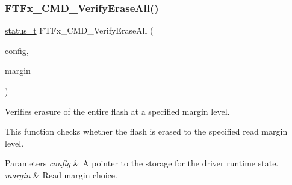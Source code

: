\subsubsection{\texorpdfstring{FTFx\_CMD\_VerifyEraseAll()}{FTFx\_CMD\_VerifyEraseAll()}}
{\footnotesize\ttfamily \mbox{\hyperlink{group__ksdk__common_gaaabdaf7ee58ca7269bd4bf24efcde092}{status\+\_\+t}} F\+T\+Fx\+\_\+\+C\+M\+D\+\_\+\+Verify\+Erase\+All (\begin{DoxyParamCaption}\item[{\mbox{\hyperlink{group__ftfx__controller_gab0196063c05bffb4cd2f249699a3378c}{ftfx\+\_\+config\+\_\+t}} $\ast$}]{config,  }\item[{\mbox{\hyperlink{group__ftfx__controller_ga2cef5154a854c303445b4bd5139f6392}{ftfx\+\_\+margin\+\_\+value\+\_\+t}}}]{margin }\end{DoxyParamCaption})}



Verifies erasure of the entire flash at a specified margin level. 

This function checks whether the flash is erased to the specified read margin level.


\begin{DoxyParams}{Parameters}
{\em config} & A pointer to the storage for the driver runtime state. \\
\hline
{\em margin} & Read margin choice.\\
\hline
\end{DoxyParams}

